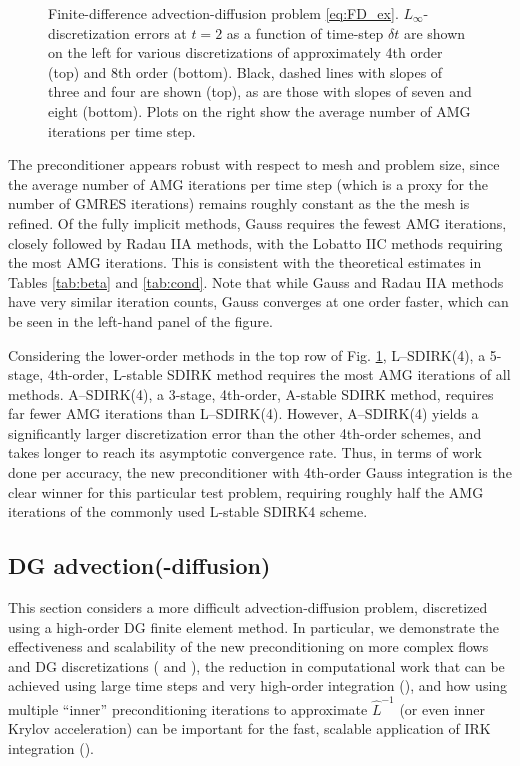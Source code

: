 \documentclass[review]{siamart}
\begin{document}
\begin{figure}[!htb]
{}
\caption{Finite-difference advection-diffusion problem \eqref{eq:FD_ex}. $L_{\infty}$-discretization errors at $t = 2$ as a function of time-step $\delta t$ are shown on
the left for various discretizations of approximately 4th order (top) and 8th order (bottom). Black, dashed lines with slopes of three and four are shown (top), as are those with slopes of seven and eight (bottom). Plots on the right show the average number of AMG iterations per time step.
\label{fig:FD_ex}
}
\end{figure}

The preconditioner appears robust with respect to mesh and problem size, since
the average number of AMG iterations per time step (which is a proxy for the
number of GMRES iterations) remains roughly constant as the the mesh is refined.
Of the fully implicit methods, Gauss requires the fewest AMG iterations, closely
followed by Radau IIA methods, with the Lobatto IIC methods requiring the most
AMG iterations. This is
consistent with the theoretical estimates in Tables \ref{tab:beta} and \ref{tab:cond}.
Note that while Gauss and Radau IIA methods have very similar
iteration counts, Gauss converges at one order faster, which can be seen in the
left-hand panel of the figure.

Considering the lower-order methods in the top
row of Fig. \ref{fig:FD_ex}, L--SDIRK(4), a 5-stage, 4th-order, L-stable SDIRK
method requires the most AMG iterations of all methods. A--SDIRK(4), a 3-stage,
4th-order, A-stable SDIRK method, requires far fewer AMG iterations than
L--SDIRK(4). However, A--SDIRK(4) yields a significantly larger discretization
error than the other 4th-order schemes, and takes longer to reach its asymptotic
convergence rate. Thus, in terms of work done per accuracy, the new
preconditioner with 4th-order Gauss integration is the clear winner
for this particular test problem, requiring roughly half the AMG iterations
of the commonly used L-stable SDIRK4 scheme.

\subsection{DG advection(-diffusion)}\label{sec:numerics:dg}

This section considers a more difficult advection-diffusion problem, discretized
using a high-order DG finite element method. In particular, we demonstrate
the effectiveness and scalability of the new preconditioning on more complex flows and
DG discretizations ( and ),
the reduction in computational work that can be achieved using large time steps and
very high-order integration (), and how
using multiple ``inner'' preconditioning iterations to approximate $\widehat{L}^{-1}$
(or even inner Krylov acceleration) can be important for the fast, scalable
application of IRK integration ().
\end{document}
